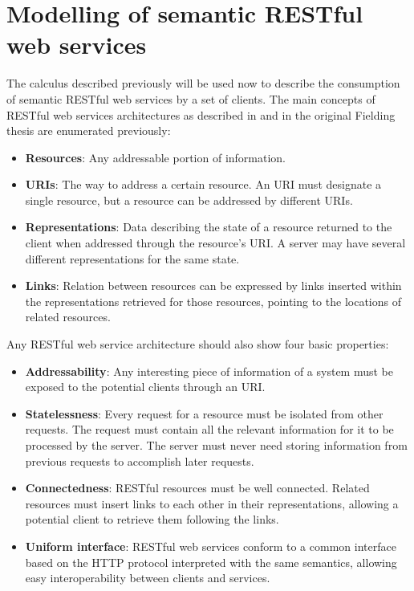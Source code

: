 \section{Modelling of semantic RESTful web services}
The calculus described previously will be used now to describe the consumption of semantic RESTful web services by a set of clients.
The main concepts of RESTful web services architectures as described in \cite{RichardsonRuby07} and in the original Fielding thesis \cite{Fiel00} are enumerated previously:

\begin{itemize}
  \item {\bf Resources}: Any addressable portion of information.
  \item {\bf URIs}: The way to address a certain resource. An URI must designate a single resource, but a resource can be addressed by different URIs.
  \item {\bf Representations}: Data describing the state of a resource returned to the client when addressed through the resource's URI. A server may have several different representations for the same state.
  \item {\bf Links}: Relation between resources can be expressed by links inserted within the representations retrieved for those resources, pointing to the locations of related resources.
\end{itemize}

Any RESTful web service architecture should also show four basic properties:

\begin{itemize}
  \item {\bf Addressability}: Any interesting piece of information of a system must be exposed to the potential clients through an URI.
  \item {\bf Statelessness}: Every request for a resource must be isolated from other requests. The request must contain all the relevant information for it to be processed by the server. The server must never need storing information from previous requests to accomplish later requests.
  \item {\bf Connectedness}: RESTful resources must be well connected. Related resources must insert links to each other in their representations, allowing a potential client to retrieve them following the links.
  \item {\bf Uniform interface}: RESTful web services conform to a common interface based on the HTTP protocol interpreted with the same semantics, allowing easy interoperability between clients and services.
\end{itemize}

